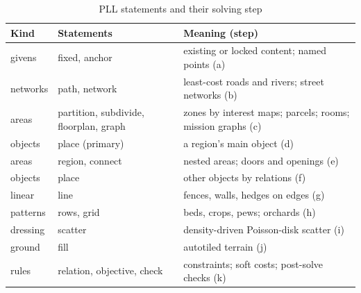\documentclass[conference]{IEEEtran}
\begin{document}
\begin{table}[t]
\caption{PLL statements and their solving step}
\label{tab:pll}
\centering
\footnotesize
\begin{tabular}{@{}p{1.25cm} >{\ttfamily}p{2.85cm} p{3.5cm}@{}}
\hline
\textbf{Kind} & \textrm{\textbf{Statements}} & \textbf{Meaning (step)} \\
\hline
givens & fixed, anchor & existing or locked content; named points (a) \\
networks & path, network & least-cost roads and rivers; street networks (b) \\
areas & partition, subdivide, floorplan, graph & zones by interest maps; parcels; rooms; mission graphs (c) \\
objects & place (primary) & a region's main object (d) \\
areas & region, connect & nested areas; doors and openings (e) \\
objects & place & other objects by relations (f) \\
linear & line & fences, walls, hedges on edges (g) \\
patterns & rows, grid & beds, crops, pews; orchards (h) \\
dressing & scatter & density-driven Poisson-disk scatter (i) \\
ground & fill & autotiled terrain (j) \\
rules & relation, objective, check & constraints; soft costs; post-solve checks (k) \\
\hline
\end{tabular}
\end{table}
\end{document}
